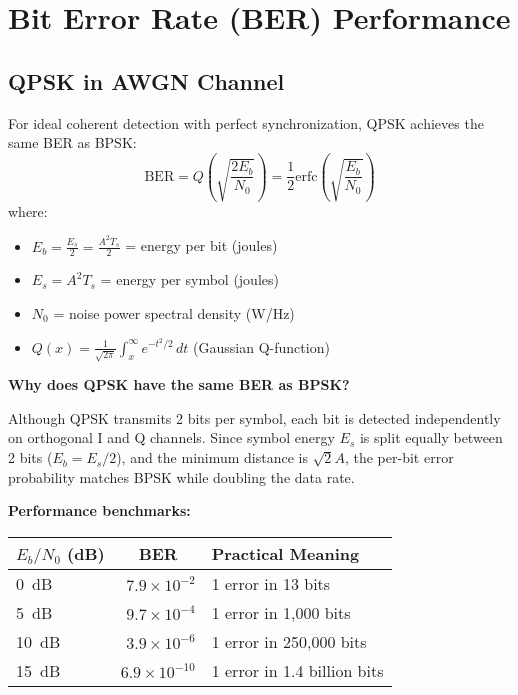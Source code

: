 \section{Bit Error Rate (BER) Performance}

\subsection{QPSK in AWGN Channel}

For ideal coherent detection with perfect synchronization, QPSK achieves the same BER as BPSK:
\begin{equation}
\mathrm{BER} = Q\left(\sqrt{\frac{2E_b}{N_0}}\right) = \frac{1}{2}\mathrm{erfc}\left(\sqrt{\frac{E_b}{N_0}}\right)
\end{equation}
where:
\begin{itemize}
\item $E_b = \frac{E_s}{2} = \frac{A^2 T_s}{2}$ = energy per bit (joules)
\item $E_s = A^2 T_s$ = energy per symbol (joules)
\item $N_0$ = noise power spectral density (W/Hz)
\item $Q(x) = \frac{1}{\sqrt{2\pi}}\int_x^\infty e^{-t^2/2}\,dt$ (Gaussian Q-function)
\end{itemize}

\begin{keyconcept}
\textbf{Why does QPSK have the same BER as BPSK?}

Although QPSK transmits 2 bits per symbol, each bit is detected independently on orthogonal I and Q channels. Since symbol energy $E_s$ is split equally between 2 bits ($E_b = E_s/2$), and the minimum distance is $\sqrt{2}A$, the per-bit error probability matches BPSK while doubling the data rate.
\end{keyconcept}

\textbf{Performance benchmarks:}

\begin{center}
\begin{tabular}{@{}lrl@{}}
\toprule
$E_b/N_0$ (dB) & \multicolumn{1}{c}{BER} & Practical Meaning \\
\midrule
0~dB & $7.9 \times 10^{-2}$ & 1 error in 13 bits \\
5~dB & $9.7 \times 10^{-4}$ & 1 error in 1,000 bits \\
10~dB & $3.9 \times 10^{-6}$ & 1 error in 250,000 bits \\
15~dB & $6.9 \times 10^{-10}$ & 1 error in 1.4 billion bits \\
\bottomrule
\end{tabular}
\end{center}

